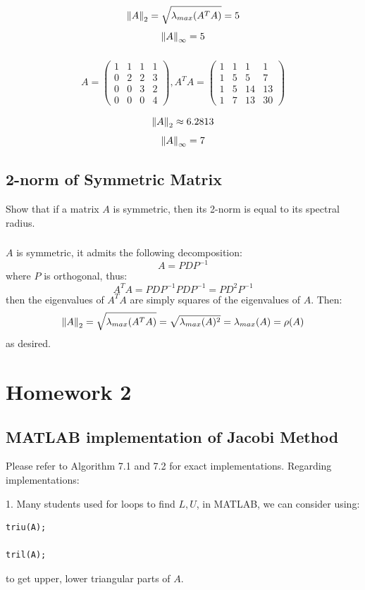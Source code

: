 \documentclass[12pt]{article} %
\newcommand{\1}[1]{\mathds{1}\left[#1\right]}
\begin{document}
$$
	\norm{A}_2 = \sqrt{\lambda_{max}(A^TA)} = 5
$$
$$
	\norm{A}_{\infty} = 5
$$


\subsubsection{}
$$
A = \begin{pmatrix}
	1 & 1 & 1 & 1\\
	0 & 2 & 2 & 3\\
	0 & 0 & 3 & 2\\
	0 & 0 & 0 & 4
	\end{pmatrix},
	A^TA = 
	 \begin{pmatrix}
	1 & 1 & 1 & 1\\
	1 & 5 & 5 & 7\\
	1 & 5 & 14 & 13\\
	1 & 7 & 13 & 30
	\end{pmatrix}
$$ 

$$
\norm{A}_2\approx 6.2813
$$
$$
	\norm{A}_{\infty} = 7
$$

\newpage

\subsection{2-norm of Symmetric Matrix}
Show that if a matrix $A$ is symmetric, then its 2-norm is equal to its spectral radius.
\subsubsection{}
$A$ is symmetric, it admits the following decomposition:
$$
	A = PDP^{-1}
$$ where $P$ is orthogonal, thus:
$$
	A^TA = PDP^{-1}PDP^{-1} = PD^2P^{-1}
$$ then the eigenvalues of $A^TA$ are simply squares of the eigenvalues of $A$. Then:
$$
	\norm{A}_2 = \sqrt{\lambda_{max}(A^TA)} = \sqrt{\lambda_{max}(A)^2}  = \lambda_{max}(A) = \rho(A)
$$ as desired.


\newpage
\section{Homework 2}
\subsection{MATLAB implementation of Jacobi Method}
Please refer to Algorithm 7.1 and 7.2 for exact implementations. Regarding implementations:

1. Many students used for loops to find $L, U$, in MATLAB, we can consider using:
\begin{verbatim}
triu(A);

tril(A);
\end{verbatim} to get upper, lower triangular parts of $A$.
\end{document}
